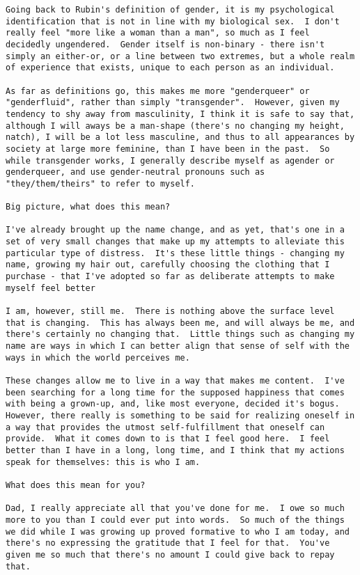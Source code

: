 \begin{paracol}{2}
\begin{leftcolumn}
\begin{verbatim}
Going back to Rubin's definition of gender, it is my psychological identification that is not in line with my biological sex.  I don't really feel "more like a woman than a man", so much as I feel decidedly ungendered.  Gender itself is non-binary - there isn't simply an either-or, or a line between two extremes, but a whole realm of experience that exists, unique to each person as an individual.

As far as definitions go, this makes me more "genderqueer" or "genderfluid", rather than simply "transgender".  However, given my tendency to shy away from masculinity, I think it is safe to say that, although I will aways be a man-shape (there's no changing my height, natch), I will be a lot less masculine, and thus to all appearances by society at large more feminine, than I have been in the past.  So while transgender works, I generally describe myself as agender or genderqueer, and use gender-neutral pronouns such as "they/them/theirs" to refer to myself.

Big picture, what does this mean?

I've already brought up the name change, and as yet, that's one in a set of very small changes that make up my attempts to alleviate this particular type of distress.  It's these little things - changing my name, growing my hair out, carefully choosing the clothing that I purchase - that I've adopted so far as deliberate attempts to make myself feel better

I am, however, still me.  There is nothing above the surface level that is changing.  This has always been me, and will always be me, and there's certainly no changing that.  Little things such as changing my name are ways in which I can better align that sense of self with the ways in which the world perceives me.

These changes allow me to live in a way that makes me content.  I've been searching for a long time for the supposed happiness that comes with being a grown-up, and, like most everyone, decided it's bogus.  However, there really is something to be said for realizing oneself in a way that provides the utmost self-fulfillment that oneself can provide.  What it comes down to is that I feel good here.  I feel better than I have in a long, long time, and I think that my actions speak for themselves: this is who I am.

What does this mean for you?

Dad, I really appreciate all that you've done for me.  I owe so much more to you than I could ever put into words.  So much of the things we did while I was growing up proved formative to who I am today, and there's no expressing the gratitude that I feel for that.  You've given me so much that there's no amount I could give back to repay that.


\end{verbatim}
\end{leftcolumn}
\end{paracol}
